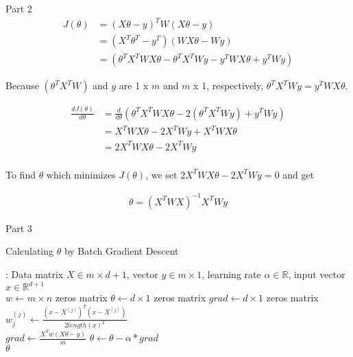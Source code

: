 \documentclass[12pt]{article}
\begin{document}
	\noindent Part 2
	\begin{align*}
	J(\theta) &= (X\theta - y)^{T}W(X\theta -y)\\
	&= (X^{T}\theta^{T}-y^{T})(WX\theta - Wy)\\
	&= (\theta^{T}X^{T}WX\theta - \theta^{T}X^{T}Wy - y^{T}WX\theta + y^{T}Wy)
	\end{align*}
	
	\begin{center}
	Because $(\theta^{T}X^{T}W)$ and $y$ are 1 x $m$ and $m$ x 1, respectively, $\theta^{T}X^{T}Wy =  y^{T}WX\theta$.
	\end{center}

	\begin{align*}
	\frac{dJ(\theta)}{d\theta} 
	&=\frac{d}{d\theta}(\theta^{T}X^{T}WX\theta - 2(\theta^{T}X^{T}Wy) + y^{T}Wy)\\
	&=X^{T}WX\theta - 2X^{T}Wy + X^{T}WX\theta \\
	&= 2X^{T}WX\theta - 2X^{T}Wy\\
	\end{align*}
	\begin{center}
	To find $\theta$ which minimizes $J(\theta)$, we set $2X^{T}WX\theta - 2X^{T}Wy = 0$ 
	and get
	\end{center}
	\begin{align*}
	\theta = (X^{T}WX)^{-1}X^{T}Wy
	\end{align*}

	\noindent  Part 3

	\begin{algorithm}
		\caption{Calculating $\theta$ by Batch Gradient Descent}
		\begin{algorithmic}
			: Data matrix $X \in m\times d+1$, vector $y\in m\times 1$, learning rate $\alpha\in \mathbb{R}$, input vector $x\in\mathbb{R}^{d+1}$\\
			
			\State $w\gets m\times n$ zeros matrix
			\State $\theta\gets d\times 1$ zeros matrix
			\State $grad\gets d\times 1$ zeros matrix\\
			\State $w_j^{(j)}\gets\frac{(x-X^{(j)})^T(x-X^{(j)})}{2length(x)^2}$
			\EndFor\\
			 
			\State $grad\gets\frac{X^Tw(X\theta-y)}{m}$
			\State $\theta\gets\theta-\alpha*grad$
			\EndFor\\
			\State \Return $\theta$
		\end{algorithmic}
	\end{algorithm}
		
\end{document}

